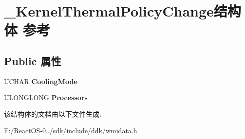\hypertarget{struct___kernel_thermal_policy_change}{}\section{\+\_\+\+Kernel\+Thermal\+Policy\+Change结构体 参考}
\label{struct___kernel_thermal_policy_change}
\subsection*{Public 属性}
\begin{DoxyCompactItemize}
\item 
\mbox{\label{struct___kernel_thermal_policy_change_a53e13c2ae6ae8bf4b472ede3398b2497}} 
U\+C\+H\+AR {\bfseries Cooling\+Mode}
\item 
\mbox{\label{struct___kernel_thermal_policy_change_a10a12d425c55ba9dc3b2d99458f11411}} 
U\+L\+O\+N\+G\+L\+O\+NG {\bfseries Processors}
\end{DoxyCompactItemize}


该结构体的文档由以下文件生成\+:\begin{DoxyCompactItemize}
\item 
E\+:/\+React\+O\+S-\/0../sdk/include/ddk/wmidata.\+h\end{DoxyCompactItemize}
